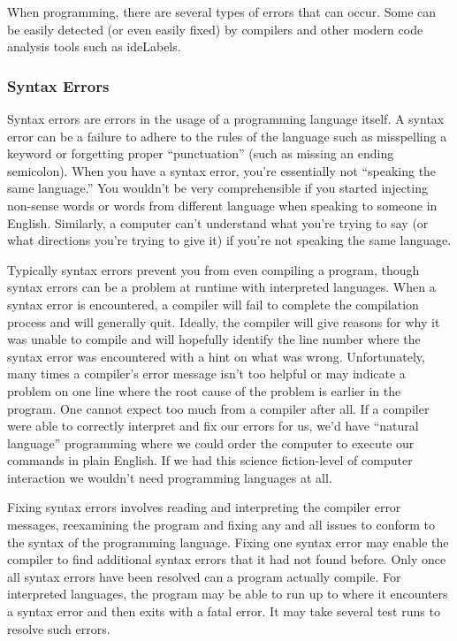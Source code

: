 When programming, there are several types of errors that can occur.  Some 
can be easily detected (or even easily fixed) by compilers and other modern 
code analysis tools such as \glspl{ideLabel}.

\subsubsection{Syntax Errors}

Syntax errors are errors in the usage of a programming language itself.  A syntax
error can be a failure to adhere to the rules of the language such as misspelling 
a keyword or forgetting proper ``punctuation'' (such as missing an ending semicolon).
When you have a syntax error, you're essentially not ``speaking the same language.''
You wouldn't be very comprehensible if you started injecting non-sense words 
or words from different language when speaking to someone in English.  Similarly,
a computer can't understand what you're trying to say (or what directions you're 
trying to give it) if you're not speaking the same language.

Typically syntax errors prevent you from even compiling a program, though 
syntax errors can be a problem at runtime with interpreted languages.  
When a syntax error is encountered, a compiler will fail to complete 
the compilation process and will
generally quit.  Ideally, the compiler will give reasons for why it was unable to 
compile and will hopefully identify the line number where the syntax error was
encountered with a hint on what was wrong.  Unfortunately, many times a compiler's
error message isn't too helpful or may indicate a problem on one line where
the root cause of the problem is earlier in the program.  One cannot expect
too much from a compiler after all.  If a compiler were able to correctly
interpret and fix our errors for us, we'd have ``natural language'' programming
where we could order the computer to execute our commands in plain English.  
If we had this science fiction-level of computer interaction we wouldn't need 
programming languages at all.

Fixing syntax errors involves reading and interpreting the compiler error messages, 
reexamining the program and fixing any and all issues to conform to the syntax
of the programming language.  Fixing one syntax
error may enable the compiler to find additional syntax errors that it had not
found before.  Only once all syntax errors have been resolved can a program actually
compile.  For interpreted languages, the program may be able to run up to
where it encounters a syntax error and then exits with a fatal error.  It may take
several test runs to resolve such errors.

